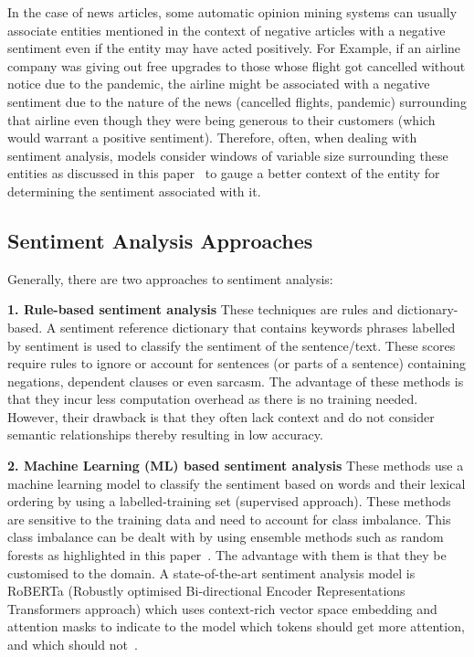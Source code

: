 In the case of news articles, some automatic opinion mining systems can usually associate entities mentioned in the context of negative articles with a negative sentiment even if the entity may have acted positively. For Example, if an airline company was giving out free upgrades to those whose flight got cancelled without notice due to the pandemic, the airline might be associated with a negative sentiment due to the nature of the news (cancelled flights, pandemic) surrounding that airline even though they were being generous to their customers (which would warrant a positive sentiment). Therefore, often, when dealing with sentiment analysis, models consider windows of variable size surrounding these entities as discussed in this paper~\cite{20_balahur2013sentiment} to gauge a better context of the entity for determining the sentiment associated with it.

\newpage
\subsection{Sentiment Analysis Approaches}

Generally, there are two approaches to sentiment analysis: 

\textbf{1. Rule-based sentiment analysis}
These techniques are rules and dictionary-based. A sentiment reference dictionary that contains keywords phrases labelled by sentiment is used to classify the sentiment of the sentence/text. These scores require rules to ignore or account for sentences (or parts of a sentence) containing negations, dependent clauses or even sarcasm. The advantage of these methods is that they incur less  computation overhead as there is no training needed. However, their drawback is that they often lack context and do not consider semantic relationships thereby resulting in low accuracy. 

\textbf{2. Machine Learning (ML) based sentiment analysis}
These methods use a machine learning model to classify the sentiment based on words and their lexical ordering by using a labelled-training set (supervised approach). These methods are sensitive to the training data and need to account for class imbalance. This class imbalance can be dealt with by using ensemble methods such as random forests as highlighted in this paper~\cite{18_kanakaraj2015nlp}. The advantage with them is that they be customised to the domain. A state-of-the-art sentiment analysis model is RoBERTa (Robustly optimised Bi-directional Encoder Representations Transformers approach) which uses context-rich vector space embedding and attention masks to indicate to the model which tokens should get more attention, and which should not~\cite{roberta}.

